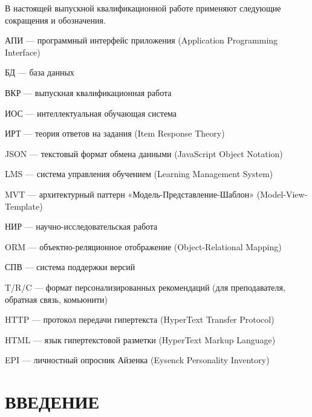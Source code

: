 \documentclass[a4paper,12pt]{article}
\begin{document}
В настоящей выпускной квалификационной работе применяют следующие сокращения и обозначения.

АПИ --- программный интерфейс приложения (Application Programming Interface)

БД --- база данных

ВКР --- выпускная квалификационная работа

ИОС --- интеллектуальная обучающая система

ИРТ --- теория ответов на задания (Item Response Theory)

JSON --- текстовый формат обмена данными (JavaScript Object Notation)

LMS --- система управления обучением (Learning Management System)

MVT --- архитектурный паттерн «Модель-Представление-Шаблон» (Model-View-Template)

НИР --- научно-исследовательская работа

ORM --- объектно-реляционное отображение (Object-Relational Mapping)

СПВ --- система поддержки версий

T/R/C --- формат персонализированных рекомендаций (для преподавателя, обратная связь, комьюнити)

HTTP --- протокол передачи гипертекста (HyperText Transfer Protocol)

HTML --- язык гипертекстовой разметки (HyperText Markup Language)

EPI --- личностный опросник Айзенка (Eysenck Personality Inventory)

\pagebreak

\section*{\centering ВВЕДЕНИЕ}
\pagebreak

%
\pagebreak
\pagebreak
\pagebreak
\pagebreak


\end{document}
